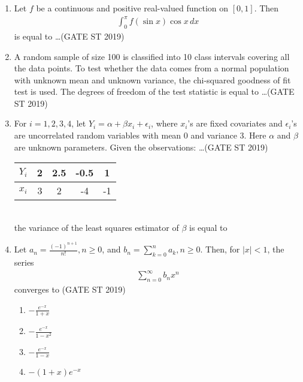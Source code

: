 \documentclass[journal]{IEEEtran}
\begin{document}
\begin{enumerate}[start=1]
\item Let \(f\) be a continuous and positive real-valued function on \([0,1]\). Then
\begin{align*}
\int_0^\pi f(\sin x) \cos x \, dx
\end{align*}
is equal to \ldots \hfill(GATE ST 2019)

\item A random sample of size 100 is classified into 10 class intervals covering all the data points. To test whether the data comes from a normal population with unknown mean and unknown variance, the chi-squared goodness of fit test is used. The degrees of freedom of the test statistic is equal to \ldots \hfill(GATE ST 2019)

\item For \(i = 1,2,3,4\), let \(Y_i = \alpha + \beta x_i + \epsilon_i\), where \(x_i\)'s are fixed covariates and \(\epsilon_i\)'s are uncorrelated random variables with mean 0 and variance 3. Here \(\alpha\) and \(\beta\) are unknown parameters. Given the observations: \ldots \hfill(GATE ST 2019)

\begin{tabular}{|c|c|c|c|c|}
\hline
$Y_i$ & 2 & 2.5 & -0.5 & 1 \\
\hline
$x_i$ & 3 & 2 & -4 & -1 \\
\hline
\end{tabular}\\
the variance of the least squares estimator of \(\beta\) is equal to 

\item Let \(a_n = \frac{(-1)^{n+1}}{n!}, n \geq 0\), and \(b_n = \sum_{k=0}^n a_k, n \geq 0\). Then, for \(|x| < 1\), the series
\begin{align*}
\sum_{n=0}^\infty b_n x^n
\end{align*}
converges to \hfill(GATE ST 2019)
\begin{multicols}{4}
\begin{enumerate}
\item \(-\frac{e^{-x}}{1+x}\)
\item \(-\frac{e^{-x}}{1-x^2}\)
\item \(-\frac{e^{-x}}{1-x}\)
\item \(- (1 + x) e^{-x}\)
\end{enumerate}
\end{multicols}


\end{enumerate}
\end{document}
